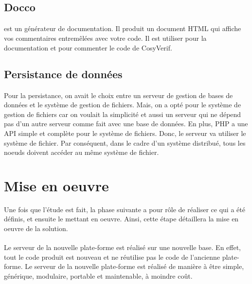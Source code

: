 \documentclass{report}
\begin{document}
\subsection{Docco}

\paragraph{}
est un générateur de documentation. Il produit un document HTML qui affiche vos commentaires entremêlées avec 
votre code. Il est utiliser pour la documentation et pour commenter le code de CosyVerif.

\subsection{Persistance de données}

\paragraph{}
Pour la persistance, on avait le choix entre un serveur de gestion de bases de données et le système de gestion de fichiers.
Mais, on a opté pour le système de gestion de fichiers car on voulait la simplicité et aussi un serveur qui ne dépend pas
d'un autre serveur comme fait avec une base de données. En plus, PHP a une API simple et complète pour le système de 
fichiers. Donc, le serveur va utiliser le système de fichier. Par conséquent, dans le cadre d'un système distribué, tous
les noeuds doivent accéder au même système de fichier.

\section{Mise en oeuvre}

\paragraph{}
Une fois que l'étude est fait,  la phase suivante a pour rôle de réaliser ce qui a été définis, et ensuite le mettant en oeuvre.
Ainsi, cette étape détaillera la mise en oeuvre de la solution.

\paragraph{}
Le serveur de la nouvelle plate-forme est réalisé sur une nouvelle base. En effet, tout le code produit est nouveau et ne 
réutilise pas le code de l'ancienne plate-forme. Le serveur de la nouvelle plate-forme est réalisé de manière à être simple,
générique, modulaire, portable et maintenable, à moindre coût. 
\end{document}
